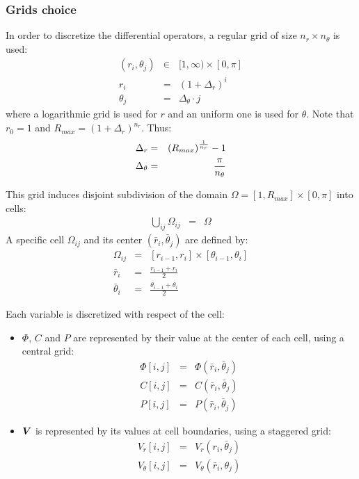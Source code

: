 \subsubsection{Grids choice}
In order to discretize the differential operators, 
a regular grid of size $n_r \times n_\theta$ is used:
\begin{eqnarray}
(r_i,\theta_j) &\in& [1, \infty) \times [0,\pi] \\ 
r_i &=& (1+\Delta_r)^i \\
\theta_j &=& \Delta_\theta \cdot j
\end{eqnarray}
where a logarithmic grid is used for $r$ and an uniform one is used for $\theta$.
Note that $r_0 = 1$ and $R_{max} = (1+\Delta_r)^{n_r}$. Thus:
\begin{eqnarray}
\Delta_r &=& \left(R_{max}\right) ^ \frac{1}{n_r} - 1 \\
\Delta_\theta &=& \frac{\pi}{n_\theta}
\end{eqnarray}

This grid induces disjoint subdivision of the domain 
$\Omega = [1, R_{max}] \times [0,\pi]$ into cells:
\begin{eqnarray}
\bigcup_{ij}\Omega_{ij} &=& \Omega
\end{eqnarray}
A specific cell $\Omega_{ij}$ and its center $(\bar{r}_i, \bar{\theta}_j)$ are defined by:
\begin{eqnarray}
\Omega_{ij} &=& [r_{i-1}, r_{i}] \times [\theta_{i-1}, \theta_{i}] \\
\bar{r}_i &=& \frac{r_{i-1} + r_{i}}{2} \\
\bar{\theta}_i &=& \frac{\theta_{i-1} + \theta_{i}}{2}
\end{eqnarray}

Each variable is discretized with respect of the cell:
\begin{itemize}
\item $\varPhi$, $C$ and $P$ are represented by their value at the center of each cell, 
using a central grid:
\begin{eqnarray}
\varPhi[i,j] &=& \varPhi(\bar{r}_i, \bar{\theta}_j) \\
C[i,j] &=& C(\bar{r}_i, \bar{\theta}_j) \\
P[i,j] &=& P(\bar{r}_i, \bar{\theta}_j) 
\end{eqnarray}
\item $\boldsymbol{V}$ is represented by its values at cell boundaries, using a staggered grid:
\begin{eqnarray}
V_r[i,j] &=& V_r(r_i, \bar{\theta}_j) \\
V_\theta[i,j] &=& V_\theta(\bar{r}_i, {\theta}_j)
\end{eqnarray}
\end{itemize}

